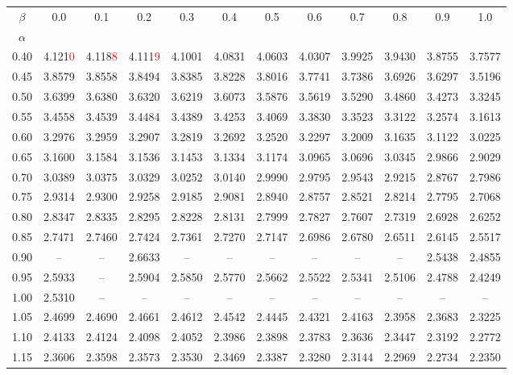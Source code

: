 \begin{tabular}{cccccccccccc}
\toprule
\(\beta\) & 0.0 & 0.1 & 0.2 & 0.3 & 0.4 & 0.5 & 0.6 & 0.7 & 0.8 & 0.9 & 1.0 \\
\(\alpha\) &  &  &  &  &  &  &  &  &  &  &  \\
\midrule
0.40 & 4.121\textcolor{red}{0} & 4.118\textcolor{red}{8} & 4.111\textcolor{red}{9} & 4.1001 & 4.0831 & 4.0603 & 4.0307 & 3.9925 & 3.9430 & 3.8755 & 3.7577 \\
0.45 & 3.8579 & 3.8558 & 3.8494 & 3.8385 & 3.8228 & 3.8016 & 3.7741 & 3.7386 & 3.6926 & 3.6297 & 3.5196 \\
0.50 & 3.6399 & 3.6380 & 3.6320 & 3.6219 & 3.6073 & 3.5876 & 3.5619 & 3.5290 & 3.4860 & 3.4273 & 3.3245 \\
0.55 & 3.4558 & 3.4539 & 3.4484 & 3.4389 & 3.4253 & 3.4069 & 3.3830 & 3.3523 & 3.3122 & 3.2574 & 3.1613 \\
0.60 & 3.2976 & 3.2959 & 3.2907 & 3.2819 & 3.2692 & 3.2520 & 3.2297 & 3.2009 & 3.1635 & 3.1122 & 3.0225 \\
0.65 & 3.1600 & 3.1584 & 3.1536 & 3.1453 & 3.1334 & 3.1174 & 3.0965 & 3.0696 & 3.0345 & 2.9866 & 2.9029 \\
0.70 & 3.0389 & 3.0375 & 3.0329 & 3.0252 & 3.0140 & 2.9990 & 2.9795 & 2.9543 & 2.9215 & 2.8767 & 2.7986 \\
0.75 & 2.9314 & 2.9300 & 2.9258 & 2.9185 & 2.9081 & 2.8940 & 2.8757 & 2.8521 & 2.8214 & 2.7795 & 2.7068 \\
0.80 & 2.8347 & 2.8335 & 2.8295 & 2.8228 & 2.8131 & 2.7999 & 2.7827 & 2.7607 & 2.7319 & 2.6928 & 2.6252 \\
0.85 & 2.7471 & 2.7460 & 2.7424 & 2.7361 & 2.7270 & 2.7147 & 2.6986 & 2.6780 & 2.6511 & 2.6145 & 2.5517 \\
0.90 & -- & -- & 2.6633 & -- & -- & -- & -- & -- & -- & 2.5438 & 2.4855 \\
0.95 & 2.5933 & -- & 2.5904 & 2.5850 & 2.5770 & 2.5662 & 2.5522 & 2.5341 & 2.5106 & 2.4788 & 2.4249 \\
1.00 & 2.5310 & -- & -- & -- & -- & -- & -- & -- & -- & -- & -- \\
1.05 & 2.4699 & 2.4690 & 2.4661 & 2.4612 & 2.4542 & 2.4445 & 2.4321 & 2.4163 & 2.3958 & 2.3683 & 2.3225 \\
1.10 & 2.4133 & 2.4124 & 2.4098 & 2.4052 & 2.3986 & 2.3898 & 2.3783 & 2.3636 & 2.3447 & 2.3192 & 2.2772 \\
1.15 & 2.3606 & 2.3598 & 2.3573 & 2.3530 & 2.3469 & 2.3387 & 2.3280 & 2.3144 & 2.2969 & 2.2734 & 2.2350 \\

\end{tabular}
